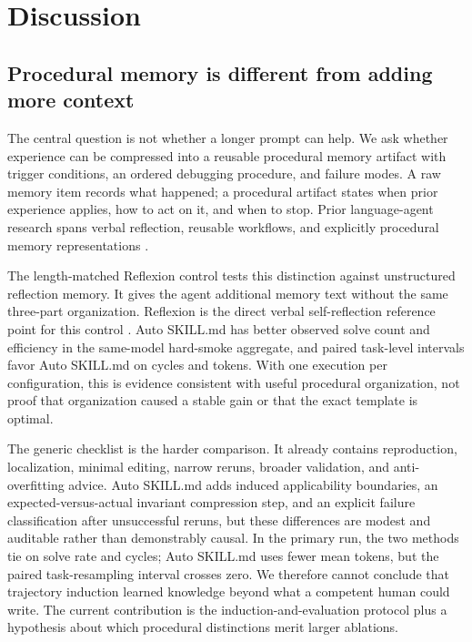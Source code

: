 \section{Discussion}
\label{sec:discussion}

\subsection{Procedural memory is different from adding more context}
\label{sec:discussion_procedural_memory}

The central question is not whether a longer prompt can help. We ask whether experience can be compressed into a reusable procedural memory artifact with trigger conditions, an ordered debugging procedure, and failure modes. A raw memory item records what happened; a procedural artifact states when prior experience applies, how to act on it, and when to stop. Prior language-agent research spans verbal reflection, reusable workflows, and explicitly procedural memory representations \cite{shinn2023reflexion,wang2025workflowmemory,fang2026memp,mi2026skillpro}.

The length-matched Reflexion control tests this distinction against unstructured reflection memory. It gives the agent additional memory text without the same three-part organization. Reflexion is the direct verbal self-reflection reference point for this control \cite{shinn2023reflexion}. Auto SKILL.md has better observed solve count and efficiency in the same-model hard-smoke aggregate, and paired task-level intervals favor Auto SKILL.md on cycles and tokens. With one execution per configuration, this is evidence consistent with useful procedural organization, not proof that organization caused a stable gain or that the exact template is optimal.

The generic checklist is the harder comparison. It already contains reproduction, localization, minimal editing, narrow reruns, broader validation, and anti-overfitting advice. Auto SKILL.md adds induced applicability boundaries, an expected-versus-actual invariant compression step, and an explicit failure classification after unsuccessful reruns, but these differences are modest and auditable rather than demonstrably causal. In the primary run, the two methods tie on solve rate and cycles; Auto SKILL.md uses fewer mean tokens, but the paired task-resampling interval crosses zero. We therefore cannot conclude that trajectory induction learned knowledge beyond what a competent human could write. The current contribution is the induction-and-evaluation protocol plus a hypothesis about which procedural distinctions merit larger ablations.

